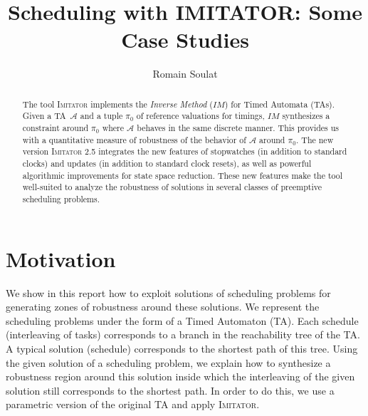 \documentclass{article}
\title{Scheduling with IMITATOR: Some Case Studies}
\author{Romain Soulat}
\date{}
\newcommand{\A}{\mathcal{A}}
\newcommand{\pio}{\pi_0}
\newcommand{\IM}{\mathit{IM}}
\newcommand{\imitator}{\textsc{Imitator}}
\begin{document}
\maketitle

\begin{abstract}
	The tool \imitator{}  implements the {\em Inverse Method} ($\IM$) for Timed Automata (TAs).
	Given a TA~$\A$ and a tuple $\pio$ of reference valuations for timings,
	$\IM$ synthesizes a constraint around  $\pio$ where $\A$ behaves in the same discrete manner.
	This provides us with a quantitative measure of robustness of the behavior of $\A$ around $\pio$.
	The new version \imitator{} 2.5 integrates the new features of stopwatches (in addition to standard clocks) and updates (in addition to standard clock resets), as well as powerful algorithmic improvements for state space reduction.
	These new features make the tool well-suited to analyze the robustness of solutions in several classes of preemptive scheduling problems.
\end{abstract}

\section{Motivation}

We show in this report how to exploit solutions of scheduling problems for generating zones of robustness around these solutions. We represent the scheduling problems under the
form of a Timed Automaton (TA). Each schedule (interleaving of tasks) corresponds to a branch in the reachability tree of the TA. A typical solution (schedule) corresponds
 to the shortest path of this tree.
Using the given solution of a scheduling problem, we explain how to synthesize a robustness region around this solution inside which the interleaving of the given solution
 still corresponds to the shortest path. In order to do this, we use a parametric version of the original TA and apply \imitator{}.
\end{document}
